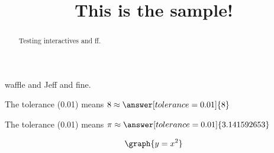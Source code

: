\documentclass{ximera}
\title{This is the sample!}
\begin{document}
\begin{abstract}
Testing interactives and ff.
\end{abstract}

\maketitle

waffle and Jeff and fine.


 \begin{problem}
   The tolerance (0.01) means $8 \approx \answer[tolerance=0.01]{8}$
 \end{problem}

\begin{problem}
\end{problem}

 \begin{problem}
   The tolerance (0.01) means $\pi \approx \answer[tolerance=0.01]{3.141592653}$
 \end{problem}

 \[
   \graph{y=x^2}
 \]




  
    
      
\end{document}
